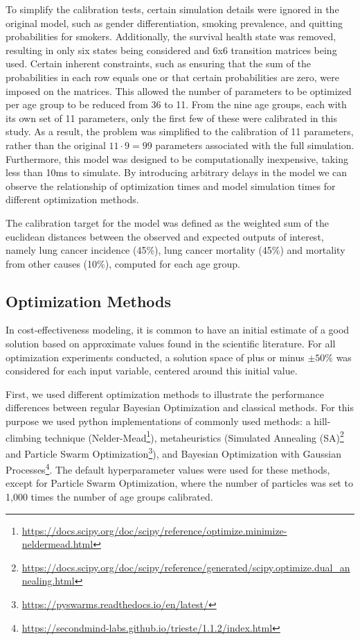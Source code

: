 \documentclass{IOS-Book-Article}
\begin{document}
	To simplify the calibration tests, certain simulation details were ignored in the original model, such as gender differentiation, smoking prevalence, and quitting probabilities for smokers. Additionally, the survival health state was removed, resulting in only six states being considered and 6x6 transition matrices being used. Certain inherent constraints, such as ensuring that the sum of the probabilities in each row equals one or that certain probabilities are zero, were imposed on the matrices. This allowed the number of parameters to be optimized per age group to be reduced from 36 to 11. From the nine age groups, each with its own set of 11 parameters, only the first few of these were calibrated in this study. As a result, the problem was simplified to the calibration of 11 parameters, rather than the original $11\cdot 9=99$ parameters associated with the full simulation. Furthermore, this model was designed to be computationally inexpensive, taking less than 10ms to simulate. By introducing arbitrary delays in the model we can observe the relationship of optimization times and model simulation times for different optimization methods.
	
	The calibration target for the model was defined as the weighted sum of the euclidean distances between the observed and expected outputs of interest, namely lung cancer incidence (45\%), lung cancer mortality (45\%) and mortality from other causes (10\%), computed for each age group.
	
	\subsection{Optimization Methods}
	In cost-effectiveness modeling, it is common to have an initial estimate of a good solution based on approximate values found in the scientific literature. For all optimization experiments conducted, a solution space of plus or minus $\pm 50\%$ was considered for each input variable, centered around this initial value.
	
	First, we used different optimization methods to illustrate the performance differences between regular Bayesian Optimization and classical methods. For this purpose we used python implementations of commonly used methods: a hill-climbing technique (Nelder-Mead\footnote{\url{https://docs.scipy.org/doc/scipy/reference/optimize.minimize-neldermead.html}}\cite{nelder-mead}), metaheuristics (Simulated Annealing (SA)\footnote{\url{https://docs.scipy.org/doc/scipy/reference/generated/scipy.optimize.dual_annealing.html}}\cite{simulated-annealing} and Particle Swarm Optimization\footnote{\url{https://pyswarms.readthedocs.io/en/latest/}}\cite{pso}), and Bayesian Optimization with Gaussian Processes\footnote{\url{https://secondmind-labs.github.io/trieste/1.1.2/index.html}}. The default hyperparameter values were used for these methods, except for Particle Swarm Optimization, where the number of particles was set to 1,000 times the number of age groups calibrated.
	
\end{document}

